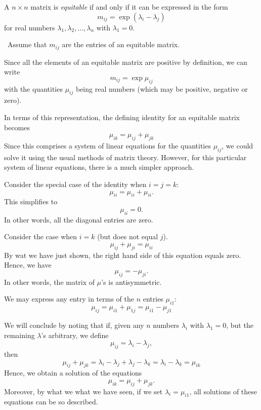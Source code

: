 \documentclass[12pt]{article}
\begin{document}
A $n \times n$ matrix is \emph{equitable} if and only if it can be expressed in the form
 $$m_{ij} = \exp (\lambda_i - \lambda_j)$$
for real numbers $\lambda_1, \lambda_2, \ldots, \lambda_n$ with $\lambda_1 = 0$.

 \,
Assume that $m_{ij}$ are the entries of an equitable matrix.

Since all the elements of an equitable matrix are positive by definition, we can write
 $$m_{ij} = \exp \mu_{ij}$$
with the quantities $\mu_{ij}$ being real numbers (which may be positive, negative or zero).

In terms of this representation, the defining identity for an equitable matrix becomes
 $$\mu_{ik} = \mu_{ij} + \mu_{jk}$$
Since this comprises a system of linear equations for the quantities $\mu_{ij}$, we could solve it using the usual methods of matrix theory.  However, for this particular system of linear equations, there is a much simpler approach.

Consider the special case of the identity when $i=j=k$:
 $$\mu_{ii} = \mu_{ii} + \mu_{ii}.$$
This simplifies to 
 $$\mu_{ii} = 0.$$
In other words, all the diagonal entries are zero.

Consider the case when $i = k$ (but does not equal $j$).
 $$\mu_{ij} + \mu_{ji} = \mu_{ii}$$
By wat we have just shown, the right hand side of this equation equals zero.  Hence, we have
 $$\mu_{ij} = - \mu_{ji}.$$
In other words, the matrix of $\mu$'s is antisymmetric.

We may express any entry in terms of the $n$ entries $\mu_{i1}$:
 $$\mu_{ij} = \mu_{i1} + \mu_{1j} = \mu_{i1} - \mu_{j1}$$

We will conclude by noting that if, given any $n$ numbers $\lambda_i$ with $\lambda_1 = 0$, but the remaining $\lambda$'s arbitrary, we define
 $$\mu_{ij} = \lambda_i - \lambda_j,$$
then
 $$\mu_{ij} + \mu_{jk} = \lambda_i - \lambda_j + \lambda_j - \lambda_k = \lambda_i - \lambda_k = \mu_{ik}$$
Hence, we obtain a solution of the equations
 $$\mu_{ik} = \mu_{ij} + \mu_{jk}.$$
Moreover, by what we what we have seen, if we set $\lambda_i = \mu_{i1}$, all solutions of these equations can be so described.
\end{document}

